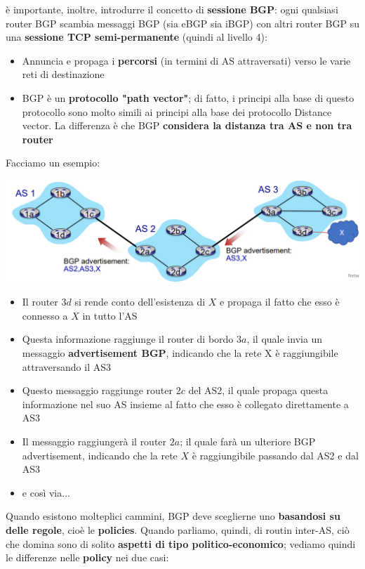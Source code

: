 \documentclass[12pt]{article}
\begin{document}
è importante, inoltre, introdurre il concetto di \textbf{sessione BGP}: ogni qualsiasi router BGP scambia messaggi BGP (sia eBGP sia iBGP) con altri router BGP 
su una \textbf{sessione TCP semi-permanente} (quindi al livello 4):
\begin{itemize}
    \item Annuncia e propaga i \textbf{percorsi} (in termini di AS attraversati) verso le varie reti di destinazione
    \item BGP è un \textbf{protocollo "path vector"}; di fatto, i principi alla base di questo protocollo sono molto simili ai principi alla base dei protocollo Distance vector. La differenza è che BGP \textbf{considera la distanza tra AS e non tra router}
\end{itemize}
Facciamo un esempio:
\begin{center}
    \includegraphics[width =0.80\linewidth]{Images/115.png}
\end{center}
\begin{itemize}
    \item Il router $3d$ si rende conto dell'esistenza di $X$ e propaga il fatto che esso è connesso a $X$ in tutto l'AS
    \item Questa informazione raggiunge il router di bordo $3a$, il quale invia un messaggio \textbf{advertisement BGP}, indicando che la rete X è raggiungibile attraversando il AS3
    \item Questo messaggio raggiunge router $2c$ del AS2, il quale propaga questa informazione nel suo AS insieme al fatto che esso è collegato direttamente a AS3
    \item Il messaggio raggiungerà il router $2a$; il quale farà un ulteriore BGP advertisement, indicando che la rete $X$ è raggiungibile passando dal AS2 e dal AS3 
    \item e così via...
\end{itemize}
Quando esistono molteplici cammini, BGP deve sceglierne uno \textbf{basandosi su delle regole}, cioè le \textbf{policies}.
Quando parliamo, quindi, di routin inter-AS, ciò che domina sono di solito \textbf{aspetti di tipo politico-economico}; vediamo quindi le differenze nelle \textbf{policy} nei due casi:
\end{document}
